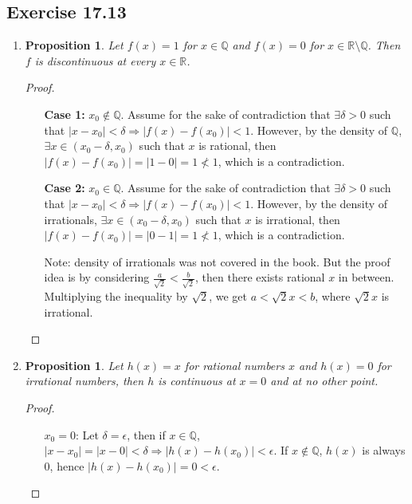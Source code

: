 \documentclass{article}
\newtheorem{proposition}[thm]{Proposition}
\renewcommand*{\implies}{\ensuremath{\Longrightarrow}}
\newcommand*{\Q}{\ensuremath{\mathbb{Q}}}
\newcommand*{\R}{\ensuremath{\mathbb{R}}}
\begin{document}
\subsection*{Exercise 17.13}
\begin{enumerate}[label=(\alph*)]
    \item \begin{proposition}
        Let $f(x)=1$ for $x\in\Q$ and $f(x)=0$ for $x\in\R\setminus\Q$. Then $f$ is discontinuous 
        at every $x\in\R$.
    \end{proposition}
    \begin{proof}\indent 
        \begin{enumerate}
            \item [\textbf{Case 1: }$x_0\notin\Q$.] Assume for the sake of contradiction that 
            $\exists \delta>0$ such that $|x-x_0|<\delta \implies |f(x)-f(x_0)|<1$. However, by 
            the density of $\Q$, $\exists x\in (x_0-\delta, x_0)$ such that $x$ is rational, 
            then $|f(x)-f(x_0)|=|1-0|=1\not< 1$, which is a contradiction.

            \item [\textbf{Case 2: }$x_0\in\Q$.] Assume for the sake of contradiction that
            $\exists \delta>0$ such that $|x-x_0|<\delta \implies |f(x)-f(x_0)|<1$. However, by
            the density of irrationals, $\exists x\in (x_0-\delta, x_0)$ such that $x$ is
            irrational, then $|f(x)-f(x_0)|=|0-1|=1\not< 1$, which is a contradiction.

            Note: density of irrationals was not covered in the book. But the proof idea is by 
            considering $\frac{a}{\sqrt{2}} < \frac{b}{\sqrt{2}}$, then there exists rational 
            $x$ in between. Multiplying the inequality by $\sqrt{2}$, we get $a <\sqrt{2}x<b$, 
            where $\sqrt{2}x$ is irrational.
        \end{enumerate}
    \end{proof}

    \item \begin{proposition}
        Let $h(x)=x$ for rational numbers $x$ and $h(x)=0$ for irrational numbers, then $h$ is
        continuous at $x=0$ and at no other point.
    \end{proposition}
    \begin{proof}\indent 
        \begin{enumerate}
            \item [$x_0=0$:] Let $\delta = \epsilon$, then if $x\in\Q$, $|x-x_0|=|x-0|<\delta\implies 
            |h(x)-h(x_0)|<\epsilon$. If $x\notin\Q$, $h(x)$ is always 0, hence 
            $|h(x)-h(x_0)|=0<\epsilon$.


\end{enumerate}
\end{proof}
\end{enumerate}
\end{document}
